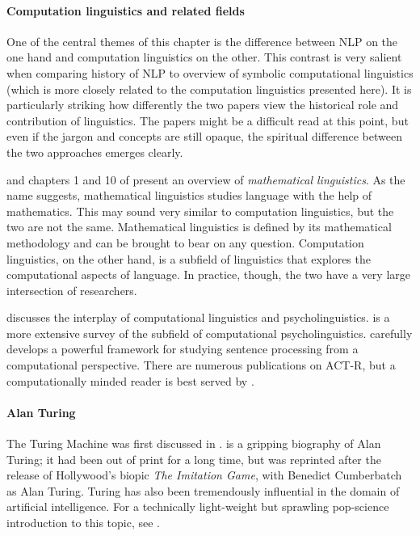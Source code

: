 \begin{literature}

\paragraph{Computation linguistics and related fields}
One of the central themes of this chapter is the difference between NLP on the one hand and computation linguistics on the other.
This contrast is very salient when comparing  history of NLP to  overview of symbolic computational linguistics (which is more closely related to the computation linguistics presented here).
It is particularly striking how differently the two papers view the historical role and contribution of linguistics.
The papers might be a difficult read at this point, but even if the jargon and concepts are still opaque, the spiritual difference between the two approaches emerges clearly.

\citet{PullumKornai03} and chapters 1 and 10 of \citet{Kornai07} present an overview of \emph{mathematical linguistics}.
As the name suggests, mathematical linguistics studies language with the help of mathematics.
This may sound very similar to computation linguistics, but the two are not the same.
Mathematical linguistics is defined by its mathematical methodology and can be brought to bear on any question.
Computation linguistics, on the other hand, is a subfield of linguistics that explores the computational aspects of language.
In practice, though, the two have a very large intersection of researchers.

\citet{Krahmer10} discusses the interplay of computational linguistics and psycholinguistics.
\citet{Crocker10} is a more extensive survey of the subfield of computational psycholinguistics.
\citet{Hale14} carefully develops a powerful framework for studying sentence processing from a computational perspective.
There are numerous publications on ACT-R, but a computationally minded reader is best served by \citet{Whitehill13}.


\paragraph{Alan Turing}
The Turing Machine was first discussed in \citet{Turing36, Turing38}.
\citet{Hodges83} is a gripping biography of Alan Turing; it had been out of print for a long time, but was reprinted after the release of Hollywood's biopic \emph{The Imitation Game}, with Benedict Cumberbatch as Alan Turing.
Turing has also been tremendously influential in the domain of artificial intelligence. 
For a technically light-weight but sprawling pop-science introduction to this topic, see \citet{Hofstadter79}.


\end{literature}
